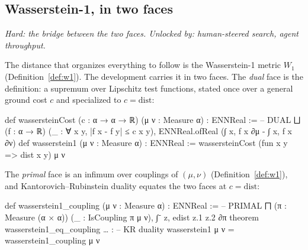 \documentclass[11pt]{article}
\theoremstyle{plain}
\theoremstyle{definition}
\theoremstyle{remark}
\newcommand{\Wone}{W_1}
\begin{document}
\subsection{Wasserstein-1, in two faces}\label{ssec:wasserstein}

\noindent\emph{Hard: the bridge between the two faces. Unlocked by: human-steered search, agent throughput.}

The distance that organizes everything to follow is the Wasserstein-1 metric
$\Wone$ (Definition~\ref{def:w1}). The development carries it in two faces. The
\emph{dual} face is the definition: a supremum over Lipschitz test functions,
stated once over a general ground cost $c$ and specialized to $c=\mathrm{dist}$:
\begin{leancode}
def wassersteinCost (c : α → α → ℝ) (μ ν : Measure α) : ENNReal :=   -- DUAL
  ⨆ (f : α → ℝ) (_ : ∀ x y, |f x - f y| ≤ c x y),
    ENNReal.ofReal (∫ x, f x ∂μ - ∫ x, f x ∂ν)
def wasserstein1 (μ ν : Measure α) : ENNReal :=
  wassersteinCost (fun x y => dist x y) μ ν
\end{leancode}
The \emph{primal} face is an infimum over couplings of $(\mu,\nu)$
(Definition~\ref{def:w1}), and Kantorovich--Rubinstein duality equates the two
faces at $c=\mathrm{dist}$:
\begin{leancode}
def wasserstein1_coupling (μ ν : Measure α) : ENNReal :=            -- PRIMAL
  ⨅ (π : Measure (α × α)) (_ : IsCoupling π μ ν), ∫⁻ z, edist z.1 z.2 ∂π
theorem wasserstein1_eq_coupling … :                               -- KR duality
    wasserstein1 μ ν = wasserstein1_coupling μ ν
\end{leancode}
\end{document}
